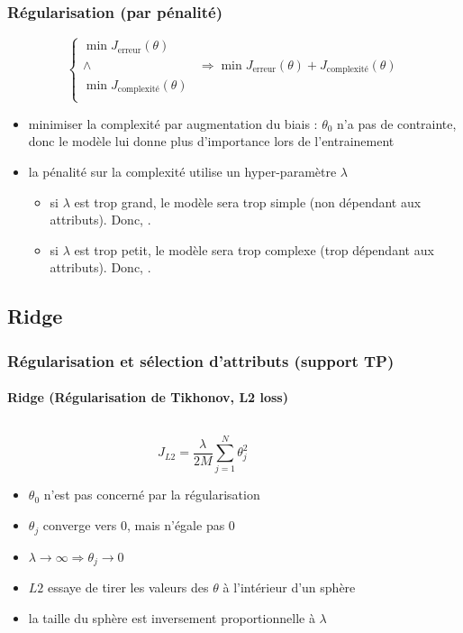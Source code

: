\documentclass[xcolor=table]{beamer}
\begin{document}
\begin{frame}
	\frametitle{Régularisation (par pénalité)}
	
	\[
	\begin{cases}
	\min J_\text{erreur}(\theta) & \\
	\wedge  & \Rightarrow \min J_\text{erreur}(\theta) + J_\text{complexité}(\theta)\\
	\min J_\text{complexité}(\theta) \\
	\end{cases}
	\]
	
	\begin{itemize}
		\item minimiser la complexité par augmentation du biais : $\theta_0$ n'a pas de contrainte, donc le modèle lui donne plus d'importance lors de l'entrainement
		\item la pénalité sur la complexité utilise un hyper-paramètre $\lambda$
		\begin{itemize}
			\item si $\lambda$ est trop grand, le modèle sera trop simple (non dépendant aux attributs). Donc, .
			\item si $\lambda$ est trop petit, le modèle sera trop complexe (trop dépendant aux attributs). Donc, .
		\end{itemize}
	\end{itemize}
	
\end{frame}

\subsection{Ridge}

\begin{frame}
	\frametitle{Régularisation et sélection d'attributs (support TP)}
	\framesubtitle{Ridge (Régularisation de Tikhonov, L2 loss)}
	
	\begin{columns}
		\begin{column}{.6\textwidth}
			\[J_{L2} = \frac{\lambda}{2M} \sum_{j=1}^{N} \theta_j^2\]
	
			\begin{itemize}
				\item $\theta_0$ n'est pas concerné par la régularisation
				\item $\theta_j$ converge vers $0$, mais n'égale pas $0$
				\item $\lambda \rightarrow \infty \Rightarrow \theta_j \rightarrow 0$
				\item $L2$ essaye de tirer les valeurs des $\theta$ à l'intérieur d'un sphère
				\item la taille du sphère est inversement proportionnelle à $\lambda$
			\end{itemize}
		\end{column}
		\begin{column}{.4\textwidth}
		\end{column}
	\end{columns}
	
\end{frame}
\end{document}
